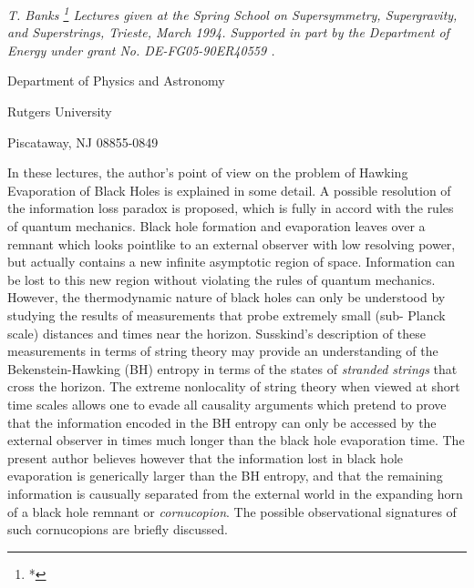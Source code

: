 \bigskip
\centerline{\it
T. Banks  \footnote{*}
{\rm  Lectures given at the Spring School on Supersymmetry, Supergravity,
 and Superstrings, Trieste, March 1994.
Supported in part by the Department of Energy under grant No.
DE-FG05-90ER40559  .} }
\smallskip
\centerline{Department of Physics and Astronomy}
\centerline{Rutgers University}
\centerline{Piscataway, NJ 08855-0849}
\noindent
\bigskip
\baselineskip 18pt
\noindent
In these lectures, the author's point of view on the problem of Hawking
Evaporation of Black Holes is explained in some detail.  A possible resolution
of the information loss paradox is proposed, which is fully in accord with the
rules of quantum mechanics.  Black hole formation and evaporation leaves
over a remnant which looks pointlike to an external observer with low resolving
power, but actually contains a new infinite asymptotic region of space.
Information can be lost to this new region without violating the rules of
quantum mechanics.  However, the thermodynamic nature of black holes can
only be understood by studying the results of measurements that probe
extremely small (sub- Planck scale) distances and times near the horizon.
Susskind's description of these measurements in terms of string theory may
provide an understanding of the Bekenstein-Hawking (BH) entropy in terms of
the states of {\it stranded strings} that cross the horizon.  The extreme
nonlocality of string theory when viewed at short time scales allows one
to evade all causality arguments which pretend to prove that the information
encoded in the BH entropy can only be accessed by the external observer
in times much longer than the black hole evaporation time.  The present author
believes however that the information lost in black hole evaporation is
generically larger than the BH entropy, and that the remaining information
is causually separated from the external world in the expanding horn of
a black hole remnant or {\it cornucopion}.  The possible observational
signatures of such cornucopions are briefly discussed.



